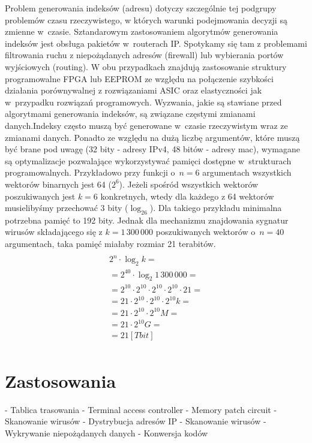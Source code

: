 Problem generowania indeksów (adresu) dotyczy szczególnie tej podgrupy problemów czasu rzeczywistego,
w których warunki podejmowania decyzji są zmienne w~czasie.
Sztandarowym zastosowaniem algorytmów generowania indeksów jest obsługa pakietów w~routerach IP.
Spotykamy się tam z problemami filtrowania ruchu z niepożądanych adresów (firewall) lub wybierania portów wyjściowych (routing).
W obu przypadkach znajdują zastosowanie struktury programowalne FPGA lub EEPROM
ze względu na połączenie szybkości działania porównywalnej z rozwiązaniami ASIC oraz elastyczności jak w~przypadku rozwiązań programowych.
Wyzwania,
jakie są stawiane przed algorytmami generowania indeksów,
są związane częstymi zmianami danych.Indeksy często muszą być generowane w~czasie rzeczywistym wraz ze zmianami danych.
Ponadto ze względu na dużą liczbę argumentów,
które muszą być brane pod uwagę (32 bity - adresy IPv4, 48 bitów - adresy mac),
wymagane są optymalizacje pozwalające wykorzystywać pamięci dostępne w~strukturach programowalnych.
Przykładowo przy funkcji o~$n=6$ argumentach wszystkich wektorów binarnych jest 64 ($2^6$).
Jeżeli spośród wszystkich wektorów poszukiwanych jest $k=6$ konkretnych, wtedy dla każdego z 64 wektorów musielibyśmy przechować 3 bity ($\log_26$).
Dla takiego przykładu minimalna potrzebna pamięć to 192 bity.
Jednak dla mechanizmu znajdowania sygnatur wirusów składającego się z $k=1\,300\,000$ poszukiwanych wektorów o~$n=40$ argumentach, taka pamięć miałaby rozmiar 21 terabitów.
\begin{multline} \\
2^n \cdot \log_2 k = \\
= 2^{40} \cdot \log_2 1\,300\,000 = \\
= 2^{10} \cdot 2^{10} \cdot 2^{10} \cdot 2^{10} \cdot 21 = \\
=21 \cdot 2^{10} \cdot 2^{10} \cdot 2^{10} k = \\
=21 \cdot 2^{10} \cdot 2^{10} M = \\
=21 \cdot 2^{10} G = \\
=21 [Tbit] \\
\end{multline}


\section{Zastosowania}
- Tablica trasowania
- Terminal access controller
- Memory patch circuit
- Skanowanie wirusów
- Dystrybucja adresów IP
- Skanowanie wirusów
- Wykrywanie niepożądanych danych
- Konwersja kodów

